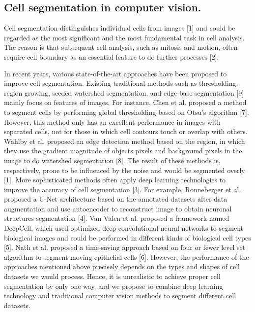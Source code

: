 \documentclass[conference]{IEEEtran}
\begin{document}
\subsection{Cell segmentation in computer vision.} 
Cell segmentation distinguishes individual cells from images [1] and could be regarded as the most significant and the most fundamental task in cell analysis. The reason is that subsequent cell analysis, such as mitosis and motion, often require cell boundary as an essential feature to do further processes [2]. \par
In recent years, various state-of-the-art approaches have been proposed to improve cell segmentation. Existing traditional methods such as thresholding, region growing, seeded watershed segmentation, and edge-base segmentation [9] mainly focus on features of images. For instance, Chen et al. proposed a method to segment cells by performing global thresholding based on Otsu's algorithm [7]. However, this method only has an excellent performance in images with separated cells, not for those in which cell contours touch or overlap with others. Wählby et al. proposed an edge detection method based on the region, in which they use the gradient magnitude of objects pixels and background pixels in the image to do watershed segmentation [8]. The result of these methods is, respectively, prone to be influenced by the noise and would be segmented overly [1]. More sophisticated methods often apply deep learning technologies to improve the accuracy of cell segmentation [3]. For example, Ronneberger et al. proposed a U-Net architecture based on the annotated datasets after data augmentation and use autoencoder to reconstruct image to obtain neuronal structures segmentation [4]. Van Valen et al. proposed a framework named DeepCell, which used optimized deep convolutional neural networks to segment biological images and could be performed in different kinds of biological cell types [5]. Nath et al. proposed a time-saving approach based on four or fewer level set algorithm to segment moving epithelial cells [6]. However, the performance of the approaches mentioned above precisely depends on the types and shapes of cell datasets we would process. Hence, it is unrealistic to achieve proper cell segmentation by only one way, and we propose to combine deep learning technology and traditional computer vision methods to segment different cell datasets.\par
\end{document}
